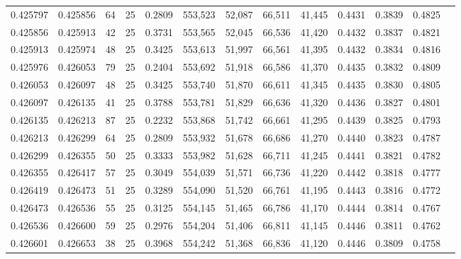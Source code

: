 \begin{tabular}{rrrrrrrrrrrrr}
0.425797 & 0.425856 &    64 &  25 &                                     0.2809 & 553,523 &  52,087 &  66,511 &  41,445 & 0.4431 & 0.3839 & 0.4825 \\
0.425856 & 0.425913 &    42 &  25 &                                     0.3731 & 553,565 &  52,045 &  66,536 &  41,420 & 0.4432 & 0.3837 & 0.4821 \\
0.425913 & 0.425974 &    48 &  25 &                                     0.3425 & 553,613 &  51,997 &  66,561 &  41,395 & 0.4432 & 0.3834 & 0.4816 \\
0.425976 & 0.426053 &    79 &  25 &                                     0.2404 & 553,692 &  51,918 &  66,586 &  41,370 & 0.4435 & 0.3832 & 0.4809 \\
0.426053 & 0.426097 &    48 &  25 &                                     0.3425 & 553,740 &  51,870 &  66,611 &  41,345 & 0.4435 & 0.3830 & 0.4805 \\
0.426097 & 0.426135 &    41 &  25 &                                     0.3788 & 553,781 &  51,829 &  66,636 &  41,320 & 0.4436 & 0.3827 & 0.4801 \\
0.426135 & 0.426213 &    87 &  25 &                                     0.2232 & 553,868 &  51,742 &  66,661 &  41,295 & 0.4439 & 0.3825 & 0.4793 \\
0.426213 & 0.426299 &    64 &  25 &                                     0.2809 & 553,932 &  51,678 &  66,686 &  41,270 & 0.4440 & 0.3823 & 0.4787 \\
0.426299 & 0.426355 &    50 &  25 &                                     0.3333 & 553,982 &  51,628 &  66,711 &  41,245 & 0.4441 & 0.3821 & 0.4782 \\
0.426355 & 0.426417 &    57 &  25 &                                     0.3049 & 554,039 &  51,571 &  66,736 &  41,220 & 0.4442 & 0.3818 & 0.4777 \\
0.426419 & 0.426473 &    51 &  25 &                                     0.3289 & 554,090 &  51,520 &  66,761 &  41,195 & 0.4443 & 0.3816 & 0.4772 \\
0.426473 & 0.426536 &    55 &  25 &                                     0.3125 & 554,145 &  51,465 &  66,786 &  41,170 & 0.4444 & 0.3814 & 0.4767 \\
0.426536 & 0.426600 &    59 &  25 &                                     0.2976 & 554,204 &  51,406 &  66,811 &  41,145 & 0.4446 & 0.3811 & 0.4762 \\
0.426601 & 0.426653 &    38 &  25 &                                     0.3968 & 554,242 &  51,368 &  66,836 &  41,120 & 0.4446 & 0.3809 & 0.4758 \\

\end{tabular}
